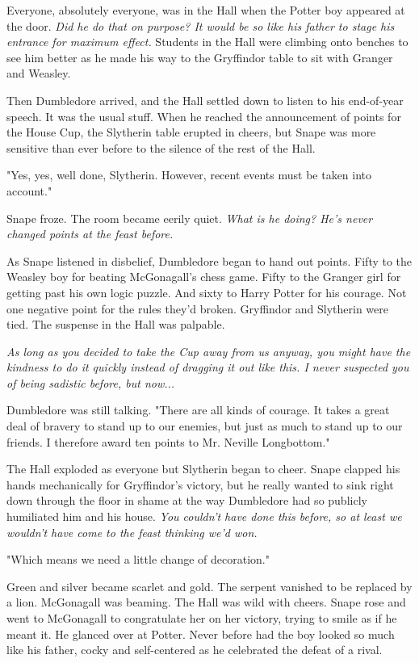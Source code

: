 Everyone, absolutely everyone, was in the Hall when the Potter boy appeared at the door. \emph{Did he do that on purpose? It would be so like his father to stage his entrance for maximum effect.} Students in the Hall were climbing onto benches to see him better as he made his way to the Gryffindor table to sit with Granger and Weasley.

Then Dumbledore arrived, and the Hall settled down to listen to his end-of-year speech. It was the usual stuff. When he reached the announcement of points for the House Cup, the Slytherin table erupted in cheers, but Snape was more sensitive than ever before to the silence of the rest of the Hall.

"Yes, yes, well done, Slytherin. However, recent events must be taken into account."

Snape froze. The room became eerily quiet. \emph{What is he doing? He's never changed points at the feast before.}

As Snape listened in disbelief, Dumbledore began to hand out points. Fifty to the Weasley boy for beating McGonagall's chess game. Fifty to the Granger girl for getting past his own logic puzzle. And sixty to Harry Potter for his courage. Not one negative point for the rules they'd broken. Gryffindor and Slytherin were tied. The suspense in the Hall was palpable.

\emph{As long as you decided to take the Cup away from us anyway, you might have the kindness to do it quickly instead of dragging it out like this. I never suspected you of being sadistic before, but now...}

Dumbledore was still talking. "There are all kinds of courage. It takes a great deal of bravery to stand up to our enemies, but just as much to stand up to our friends. I therefore award ten points to Mr. Neville Longbottom."

The Hall exploded as everyone but Slytherin began to cheer. Snape clapped his hands mechanically for Gryffindor's victory, but he really wanted to sink right down through the floor in shame at the way Dumbledore had so publicly humiliated him and his house. \emph{You couldn't have done this before, so at least we wouldn't have come to the feast thinking we'd won.}

"Which means we need a little change of decoration."

Green and silver became scarlet and gold. The serpent vanished to be replaced by a lion. McGonagall was beaming. The Hall was wild with cheers. Snape rose and went to McGonagall to congratulate her on her victory, trying to smile as if he meant it. He glanced over at Potter. Never before had the boy looked so much like his father, cocky and self-centered as he celebrated the defeat of a rival.

